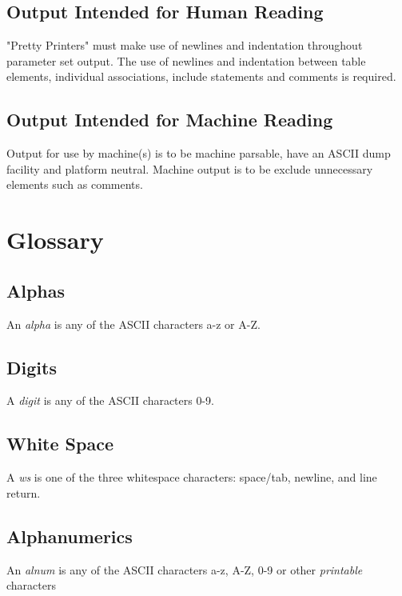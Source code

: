 \documentclass{memarticle}
\begin{document}
        \section{Output Intended for Human Reading}
                "Pretty Printers" must make use of newlines and indentation throughout parameter set output.
                The use of newlines and indentation between table elements, individual associations, include statements
                and comments is required.
        \section{Output Intended for Machine Reading}
                Output for use by machine(s) is to be machine parsable,
                have an ASCII dump facility and platform neutral.
                Machine output is to be exclude unnecessary elements such as comments.

\chapter{Glossary}
                \section{Alphas}
                        An \emph{alpha} is any of the ASCII characters a-z or A-Z.
                \section{Digits}
                        A \emph{digit} is any of the ASCII characters 0-9.
                \section{White Space}
                        A \emph{ws} is one of the three whitespace characters: space/tab, newline, and line return. 
                \section{Alphanumerics}
                        An \emph{alnum} is any of the ASCII characters a-z, A-Z, 0-9 or other \emph{printable} characters
\end{document}
